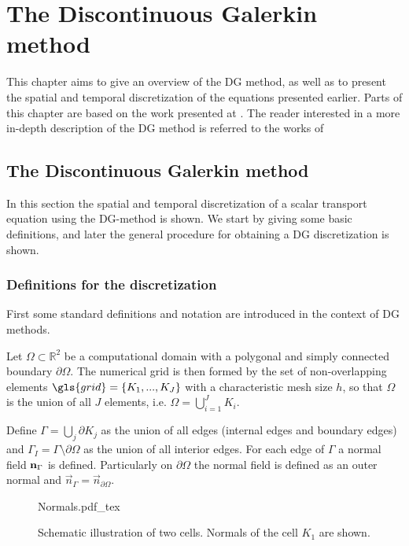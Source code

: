\chapter{The Discontinuous Galerkin method}	\label{ch:NumericalMethods}
This chapter aims to give an overview of the DG method, as well as to present the spatial and temporal discretization of the equations presented earlier. Parts of this chapter are based on the work presented at \parencite{kummerExtendedDiscontinuousGalerkin2017,kikkerFullyCoupledHighorder, smudamartinDirectNumericalSimulation2021}. The reader interested in a more in-depth description of the DG method is referred to the works of  \textcite{cockburnDevelopmentDiscontinuousGalerkin2000,hesthavenNodalDiscontinuousGalerkin2008,dipietroMathematicalAspectsDiscontinuous2012}


\section{The Discontinuous Galerkin method}
In this section the spatial and temporal discretization of a scalar transport equation using the DG-method is shown. We start by giving some basic definitions, and later the general procedure for obtaining a DG discretization is shown. 
\subsection{Definitions for the discretization} \label{ssec:SpatDiscretization}
First some standard definitions and notation are introduced in the context of DG methods. 

Let $\Omega \subset \mathbb{R}^2$ be a computational domain with a polygonal and simply connected boundary $\partial \Omega$. The numerical grid is then formed by the set of non-overlapping elements $\gls{grid} = \{K_1, ..., K_J\}$ with a characteristic mesh size $h$, so that $\Omega$ is the union of all $J$ elements, i.e. $\Omega = \bigcup_{i=1}^J K_i$. 

Define $\Gamma = \bigcup_j \partial K_j$ as the union of all edges (internal edges and boundary edges) and $\Gamma_I = \Gamma \setminus \partial \Omega$ as the union of all interior edges.
For each edge of $\Gamma$ a normal field $\textbf{n}_{\Gamma}$ is defined. Particularly on $\partial \Omega$ the normal field is defined as an outer normal and $\vec{n}_\Gamma = \vec{n}_{\partial\Omega}$.
\begin{figure}[h]
	\begin{center}
		\def\svgwidth{0.5\textwidth}
		{Normals.pdf_tex}
		\caption{Schematic illustration of two cells. Normals of the cell $K_1$ are shown. }
		\label{fig:TwoCells}
	\end{center}
\end{figure}

